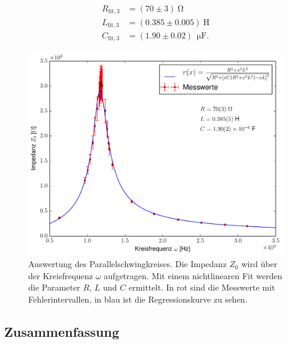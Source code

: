 \documentclass[12pt,a4paper,titlepage,headinclude]{scrartcl}
\numberwithin{equation}{subsection}
\newcommand{\mrm}[1]{\mathrm{#1}}
\begin{document}
\begin{align}
	R_{\mrm{fit},3}&=(70\pm3)~\mrm{\Omega}
	\label{eq:Rfit3}\\
	L_{\mrm{fit},3}&=(0.385\pm0.005)~\mrm{H}
	\label{eq:Lfit3}\\
	C_{\mrm{fit},3}&=(1.90\pm0.02)~\SI{}{\micro\farad}.
\end{align}
\begin{figure}[h!]
	\centering
	\includegraphics[width=\textwidth]{plot5.pdf}
	\caption{Auswertung des Parallelschwingkreises. Die Impedanz $Z_0$ wird über der Kreisfrequenz $\omega$ aufgetragen. Mit einem nichtlinearen Fit werden die Parameter $R$, $L$ und $C$ ermittelt. In rot sind die Messwerte mit Fehlerintervallen, in blau ist die Regressionskurve zu sehen.}
	\label{fig:plot5}
\end{figure}
\subsection{Zusammenfassung}
\end{document}
